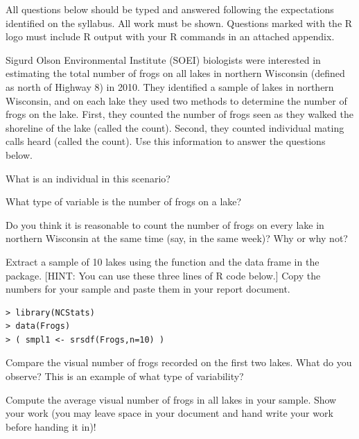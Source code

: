 \documentclass[10pt,openany]{book}\usepackage[]{graphicx}\usepackage[]{color}
\makeatletter
\newenvironment{kframe}{%
 \def\at@end@of@kframe{}%
 \ifinner\ifhmode%
  \def\at@end@of@kframe{\end{minipage}}%
  \begin{minipage}{\columnwidth}%
 \fi\fi%
 \def\FrameCommand##1{\hskip\@totalleftmargin \hskip-\fboxsep
 \colorbox{shadecolor}{##1}\hskip-\fboxsep
     \hskip-\linewidth \hskip-\@totalleftmargin \hskip\columnwidth}%
 \MakeFramed {\advance\hsize-\width
   \@totalleftmargin\z@ \linewidth\hsize
   \@setminipage}}%
 {\par\unskip\endMakeFramed%
 \at@end@of@kframe}
\newenvironment{knitrout}{}{} %
\makeatother
\begin{document}
\newpage
\begin{hwsection}{All questions below should be typed and answered following the expectations identified on the syllabus.  All work must be shown.  Questions marked with the R logo must include R output with your R commands in an attached appendix.}
  \item \label{hwprob:WhyStatsFrogs} Sigurd Olson Environmental Institute (SOEI) biologists were interested in estimating the total number of frogs on all lakes in northern Wisconsin (defined as north of Highway 8) in 2010.  They identified a sample of lakes in northern Wisconsin, and on each lake they used two methods to determine the number of frogs on the lake.  First, they counted the number of frogs seen as they walked the shoreline of the lake (called the  count).  Second, they counted individual mating calls heard (called the  count).  Use this information to answer the questions below.
    \begin{Enumerate}
      \item What is an individual in this scenario?
      \item What type of variable is the number of frogs on a lake?
      \item Do you think it is reasonable to count the number of frogs on every lake in northern Wisconsin at the same time (say, in the same week)?  Why or why not?
      \item \rhw{} Extract a sample of 10 lakes using the  function and the  data frame in the  package. [HINT: You can use these three lines of R code below.]  Copy the numbers for your sample and paste them in your report document.
\begin{knitrout}
\color{fgcolor}\begin{kframe}
\begin{verbatim}
> library(NCStats)
> data(Frogs)
> ( smpl1 <- srsdf(Frogs,n=10) )
\end{verbatim}
\end{kframe}
\end{knitrout}
\vspace{9pt}
      \item Compare the visual number of frogs recorded on the first two lakes.  What do you observe?  This is an example of what type of variability?
      \item Compute the average visual number of frogs in all lakes in your sample.  Show your work (you may leave space in your document and hand write your work before handing it in)!

\end{Enumerate}
\end{hwsection}
\end{document}
